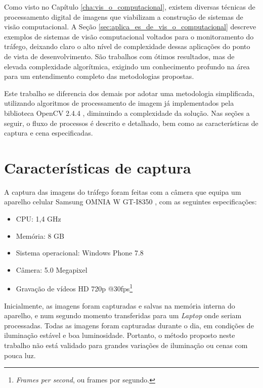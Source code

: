 
Como visto no Capítulo \ref{cha:vis_o_computacional}, existem diversas técnicas de processamento digital de imagens que viabilizam a construção de sistemas de visão computacional. A Seção \ref{sec:aplica_es_de_vis_o_computacional} descreve exemplos de sistemas de visão computacional voltados para o monitoramento do tráfego, deixando claro o alto nível de complexidade dessas aplicações do ponto de vista de desenvolvimento. São trabalhos com ótimos resultados, mas de elevada complexidade algorítmica, exigindo um conhecimento profundo na área para um entendimento completo das metodologias propostas.

Este trabalho se diferencia dos demais por adotar uma metodologia simplificada, utilizando algoritmos de processamento de imagem já implementados pela biblioteca OpenCV 2.4.4 \citep{opencv_library}, diminuindo a complexidade da solução. Nas seções a seguir, o fluxo de processos é descrito e detalhado, bem como as características de captura e cena especificadas.

\section{Características de captura} %
\label{sec:caracter_sticas_de_captura}

A captura das imagens do tráfego foram feitas com a câmera que equipa um aparelho celular Samsung OMNIA W GT-I8350 \citep{omnia:2013:online}, com as seguintes especificações:

\begin{itemize}
  \item CPU: 1,4 GHz
  \item Memória: 8 GB
  \item Sistema operacional: Windows Phone 7.8
  \item Câmera: 5.0 Megapixel
  \item Gravação de vídeos HD 720p @30fps\footnote{\textit{Frames per second}, ou frames por segundo.}
\end{itemize}

Inicialmente, as imagens foram capturadas e salvas na memória interna do aparelho, e num segundo momento transferidas para um \textit{Laptop} onde seriam processadas. Todas as imagens foram capturadas durante o dia, em condições de iluminação estável e boa luminosidade. Portanto, o método proposto neste trabalho não está validado para grandes variações de iluminação ou cenas com pouca luz.

